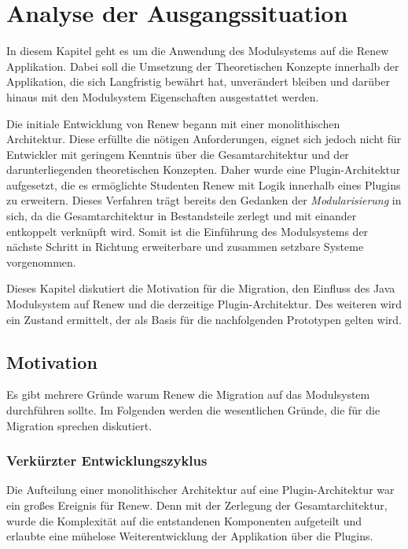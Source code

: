 \chapter{Analyse der Ausgangssituation}\label{cha:ausgangssituation}
In diesem Kapitel geht es um die Anwendung des Modulsystems auf die Renew Applikation. Dabei soll die Umsetzung der Theoretischen Konzepte innerhalb der Applikation, die sich Langfristig bewährt hat, unverändert bleiben und darüber hinaus mit den Modulsystem Eigenschaften ausgestattet werden. \bigbreak

Die initiale Entwicklung von Renew begann mit einer monolithischen Architektur. Diese erfüllte die nötigen Anforderungen, eignet sich jedoch nicht für Entwickler mit geringem Kenntnis über die Gesamtarchitektur und der darunterliegenden theoretischen Konzepten. Daher wurde eine Plugin-Architektur aufgesetzt, die es ermöglichte Studenten Renew mit Logik innerhalb eines Plugins zu erweitern. Dieses Verfahren trägt bereits den Gedanken der \textit{Modularisierung} in sich, da die Gesamtarchitektur in Bestandsteile zerlegt und mit einander entkoppelt verknüpft wird. Somit ist die Einführung des Modulsystems der nächste Schritt in Richtung erweiterbare und zusammen setzbare Systeme vorgenommen. \bigbreak

Dieses Kapitel diskutiert die Motivation für die Migration, den Einfluss des Java Modulsystem auf Renew und die derzeitige Plugin-Architektur. Des weiteren wird ein Zustand ermittelt, der als Basis für die nachfolgenden Prototypen gelten wird.

\section{Motivation}\label{sec:motivation}
Es gibt mehrere Gründe warum Renew die Migration auf das Modulsystem durchführen sollte. Im Folgenden werden die wesentlichen Gründe, die für die Migration sprechen diskutiert.  

\subsection{Verkürzter Entwicklungszyklus}\label{sub:vez}
Die Aufteilung einer monolithischer Architektur auf eine Plugin-Architektur war ein großes Ereignis für Renew. Denn mit der Zerlegung der Gesamtarchitektur, wurde die Komplexität auf die entstandenen Komponenten aufgeteilt und erlaubte eine mühelose Weiterentwicklung der Applikation über die Plugins. \bigbreak

